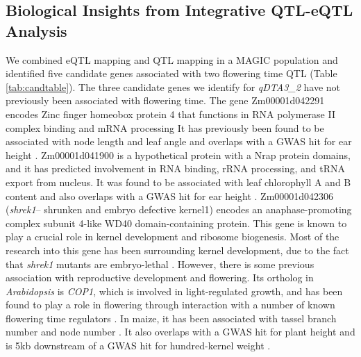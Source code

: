 \documentclass[article,9pt,twocolumn,twoside]{rilabRxiv}
\begin{document}
\subsection{Biological Insights from Integrative QTL-eQTL Analysis}
We combined eQTL mapping and QTL mapping in a MAGIC population and identified five candidate genes associated with two flowering time QTL (Table \ref{tab:candtable}).
The three candidate genes we identify for \textit{qDTA3\_2} have not previously been associated with flowering time.
The gene Zm00001d042291 encodes Zinc finger homeobox protein 4 that functions in RNA polymerase II complex binding and mRNA processing
It has previously been found to be associated with node length and leaf angle \citep{Wallace} and overlaps with a GWAS hit for ear height \citep{Peiffer2}. 
Zm00001d041900 is a hypothetical protein with a Nrap protein domains, and it has predicted involvement in RNA binding, rRNA processing, and tRNA export from nucleus.
It was found to be associated with leaf chlorophyll A and B content \citep{Wallace} and also overlaps with a GWAS hit for ear height \citep{Peiffer2}.
Zm00001d042306 (\textit{shrek1}– shrunken and embryo defective kernel1) encodes an anaphase-promoting complex subunit 4-like WD40 domain-containing protein.
This gene is known to play a crucial role in kernel development and ribosome biogenesis.
Most of the research into this gene has been surrounding kernel development, due to the fact that \textit{shrek1} mutants are embryo-lethal \citep{Liu8}. 
However, there is some previous association with reproductive development and flowering.
Its ortholog in \textit{Arabidopsis} is \textit{COP1}, which is involved in light-regulated growth, and has been found to play a role in flowering through interaction with a number of known flowering time regulators \citep{Jang,Yu4,Yang2}.
In maize, it has been associated with tassel branch number and  node number \citep{Wallace}.
It also overlaps with a GWAS hit for plant height \citep{Peiffer2} and is 5kb downstream of a GWAS hit for hundred-kernel weight \citep{Zhang5}.
\end{document}
